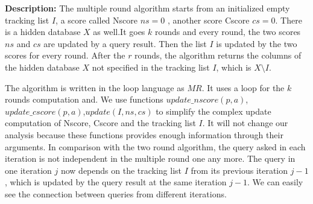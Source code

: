 \textbf{Description:}
The multiple round algorithm starts from an initialized empty tracking list $I$, a score called Nscore $ns=0$ , another score Cscore $cs=0$. There is a hidden database $X$ as well.It goes $k$ rounds and every round, the two scores $ns$ and $cs$ are updated by a query result. Then the list $I$ is updated by the two scores for every round. After the $r$ rounds, the algorithm returns the columns of the hidden database $X$ not specified in the tracking list $I$, which is $X\setminus I$. 

The algorithm is written in the loop language as $MR$. It uses a loop for the $k$ rounds computation and. We use functions $update\_nscore(p,a)$,$update\_cscore(p,a)$,$update(I,ns,cs)$ to simplify the complex update computation of Nscore, Cscore and the tracking list $I$. It will not change our analysis because these functions provides enough information through their arguments.
In comparison with the two round algorithm, the query asked in each iteration is not independent  in the multiple round one any more. The query in one iteration $j$ now depends on the tracking list $I$ from its previous iteration $j-1$, which is updated by the query result at the same iteration $j-1$. We can easily see the connection between queries from different iterations.

